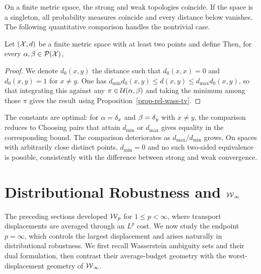 On a finite metric space, the strong and weak topologies coincide. If the space is a singleton, all probability measures coincide and every distance below vanishes. The following quantitative comparison handles the nontrivial case.

\begin{prop}
		Let $(\mathcal{X},d)$ be a finite metric space with at least two points and define
		Then, for every $\alpha,\beta\in\mathcal{P}(\mathcal{X})$,
\end{prop}

\begin{proof}
	We denote $d_0(x,y)$ the distance such that $d_0(x,x)=0$ and $d_0(x,y)=1$ for $x \neq y$. One has
	\(d_{\min} d_0(x,y) \leq d(x,y) \leq d_{\max} d_0(x,y)\),
	so that integrating this against any $\pi \in \mathcal{U}(\alpha,\beta)$ and taking the minimum among those $\pi$ gives the result using Proposition~\ref{prop-rel-wass-tv}.
\end{proof}

The constants are optimal: for $\alpha=\delta_x$ and $\beta=\delta_y$ with $x\neq y$, the comparison reduces to
%
Choosing pairs that attain $d_{\min}$ or $d_{\max}$ gives equality in the corresponding bound. The comparison deteriorates as $d_{\max}/d_{\min}$ grows. On spaces with arbitrarily close distinct points, $d_{\min}=0$ and no such two-sided equivalence is possible, consistently with the difference between strong and weak convergence.

\section{Distributional Robustness and \texorpdfstring{$\operatorname{\mathcal{W}}_\infty$}{W-infinity}}
\label{sec-dro-wasserstein-infinity}

The preceding sections developed $\operatorname{\mathcal{W}}_p$ for $1\leq p<\infty$, where transport displacements are averaged through an $L^p$ cost. We now study the endpoint $p=\infty$, which controls the largest displacement and arises naturally in distributional robustness. We first recall Wasserstein ambiguity sets and their dual formulation, then contrast their average-budget geometry with the worst-displacement geometry of $\operatorname{\mathcal{W}}_\infty$.

